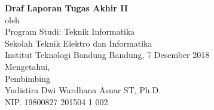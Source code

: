 \LARGE
\textbf{\thetitle}
\small

\begin{center}
	
	\vfill
	\textbf{Draf Laporan Tugas Akhir II}\\
	\vfill
	oleh\\
	\theauthor
	\vfill
	Program Studi: Teknik Informatika \\
	Sekolah Teknik Elektro dan Informatika \\
	Institut Teknologi Bandung
	\vfill
	Bandung, 7 Desember 2018 \\
	Mengetahui,\\
	Pembimbing \\
	\vspace{60pt}
	Yudistira Dwi Wardhana Asnar ST, Ph.D.\\
	NIP. 19800827 201504 1 002
\end{center}